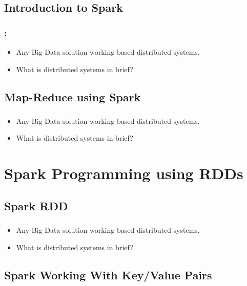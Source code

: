 \subsection{Introduction to Spark}
\begin{frame}
  \frametitle{\secname : \subsecname}
	\begin{itemize}[<+->]
		\item Any Big Data solution working based distributed systems.
		\item What is distributed systems in brief?
	\end{itemize}
\end{frame}

\subsection{Map-Reduce using Spark}
\begin{frame}
  \frametitle{\subsecname}
	\begin{itemize}[<+->]
		\item Any Big Data solution working based distributed systems.
		\item What is distributed systems in brief?
	\end{itemize}
\end{frame}

\section{Spark Programming using RDDs}
\subsection{Spark RDD}

\begin{frame}
  \frametitle{\subsecname}
	\begin{itemize}[<+->]
		\item Any Big Data solution working based distributed systems.
		\item What is distributed systems in brief?
	\end{itemize}
\end{frame}

\subsection{Spark Working With Key/Value Pairs}

